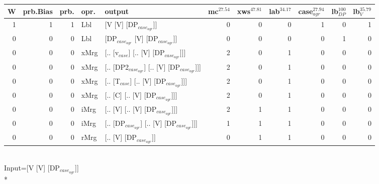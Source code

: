 \begin{tabularx}{\linewidth}{rrrlXrrrrrr}
\hline
   W &   prb.Bias &   prb. & opr.   & output                                     &   mc$^{27.54}$ &   xws$^{47.81}$ &   lab$^{34.17}$ &   case$_{agr}^{27.94}$ &   lb$_{DP}^{100}$ &   lb$_{V}^{35.79}$ \\
\hline
   1 &       1 &   1 & Lbl  & [V [V] [DP$_{case_{agr}}$]]                      &            0 &             0 &             0 &                  1 &                0 &              1 \\
   0 &       0 &   0 & Lbl  & [DP$_{case_{agr}}$ [V] [DP$_{case_{agr}}$]]            &            0 &             0 &             0 &                  0 &                1 &              0 \\
   0 &       0 &   0 & xMrg & [.. [v$_{case}$] [.. [V] [DP$_{case_{agr}}$]]]       &            2 &             0 &             1 &                  0 &                0 &              0 \\
   0 &       0 &   0 & xMrg & [.. [DP2$_{case_{agr}}$] [.. [V] [DP$_{case_{agr}}$]]] &            2 &             0 &             1 &                  0 &                0 &              0 \\
   0 &       0 &   0 & xMrg & [.. [T$_{case}$] [.. [V] [DP$_{case_{agr}}$]]]       &            2 &             0 &             1 &                  0 &                0 &              0 \\
   0 &       0 &   0 & xMrg & [.. [C] [.. [V] [DP$_{case_{agr}}$]]]            &            2 &             0 &             1 &                  0 &                0 &              0 \\
   0 &       0 &   0 & iMrg & [.. [V] [.. [V] [DP$_{case_{agr}}$]]]            &            2 &             1 &             1 &                  0 &                0 &              0 \\
   0 &       0 &   0 & iMrg & [.. [DP$_{case_{agr}}$] [.. [V] [DP$_{case_{agr}}$]]]  &            1 &             1 &             1 &                  0 &                0 &              0 \\
   0 &       0 &   0 & rMrg & [.. [V] [DP$_{case_{agr}}$]]                     &            0 &             1 &             1 &                  0 &                0 &              0 \\
\hline
\end{tabularx}\endgroup\\
\begingroup\scriptsize Input=[V [V] [DP$_{case_{agr}}$]]\\*
